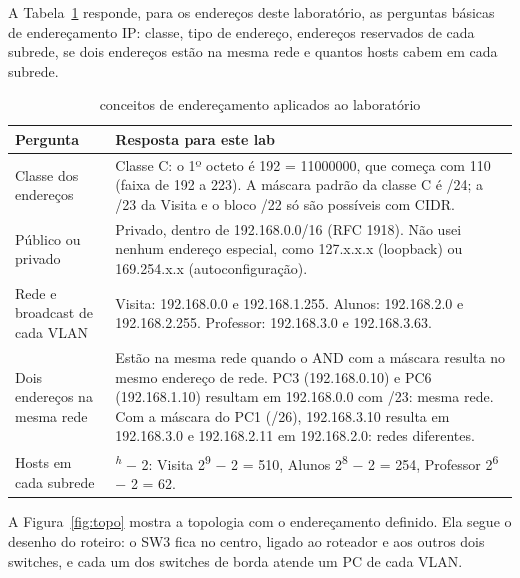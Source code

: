 
A Tabela~\ref{tab:conceitos} responde, para os endereços deste laboratório, as perguntas básicas de endereçamento IP: classe, tipo de endereço, endereços reservados de cada subrede, se dois endereços estão na mesma rede e quantos hosts cabem em cada subrede.

\begin{table}[H]
\caption{conceitos de endereçamento aplicados ao laboratório}\label{tab:conceitos}
\small\renewcommand{\arraystretch}{1.25}
\begin{tabularx}{\textwidth}{@{}>{\raggedright\arraybackslash}p{3.3cm}>{\raggedright\arraybackslash}X@{}}
\toprule
\textbf{Pergunta} & \textbf{Resposta para este lab}\\
\midrule
Classe dos endereços & Classe C: o 1º octeto é 192 = 11000000, que começa com 110 (faixa de 192 a 223). A máscara padrão da classe C é /24; a /23 da Visita e o bloco /22 só são possíveis com CIDR.\\
Público ou privado & Privado, dentro de 192.168.0.0/16 (RFC 1918). Não usei nenhum endereço especial, como 127.x.x.x (loopback) ou 169.254.x.x (autoconfiguração).\\
Rede e broadcast de cada VLAN & Visita: 192.168.0.0 e 192.168.1.255. Alunos: 192.168.2.0 e 192.168.2.255. Professor: 192.168.3.0 e 192.168.3.63.\\
Dois endereços na mesma rede & Estão na mesma rede quando o AND com a máscara resulta no mesmo endereço de rede. PC3 (192.168.0.10) e PC6 (192.168.1.10) resultam em 192.168.0.0 com /23: mesma rede. Com a máscara do PC1 (/26), 192.168.3.10 resulta em 192.168.3.0 e 192.168.2.11 em 192.168.2.0: redes diferentes.\\
Hosts em cada subrede & 2\textsuperscript{\textit{h}} − 2: Visita 2\textsuperscript{9} − 2 = 510, Alunos 2\textsuperscript{8} − 2 = 254, Professor 2\textsuperscript{6} − 2 = 62.\\
\bottomrule
\end{tabularx}
\end{table}



A Figura~\ref{fig:topo} mostra a topologia com o endereçamento definido. Ela segue o desenho do roteiro: o SW3 fica no centro, ligado ao roteador e aos outros dois switches, e cada um dos switches de borda atende um PC de cada VLAN.

